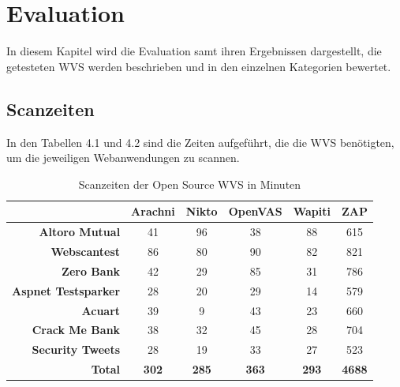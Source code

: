 \documentclass[12pt,oneside,a4paper,parskip,pointlessnumbers]{scrbook}
\begin{document}
\chapter{Evaluation}
In diesem Kapitel wird die Evaluation samt ihren Ergebnissen dargestellt, die getesteten WVS werden beschrieben und in den einzelnen Kategorien bewertet.
\section{Scanzeiten}
In den Tabellen 4.1 und 4.2 sind die Zeiten aufgeführt, die die WVS benötigten, um die jeweiligen Webanwendungen zu scannen.
\begin{table}[H]
\begin{tabular}{|r|c|c|c|c|c|}
\hline
                       & \textbf{Arachni} & \textbf{Nikto} & \textbf{OpenVAS} & \textbf{Wapiti} & \textbf{ZAP}  \\
\hline
\textbf{Altoro Mutual}      & 41               & 96             & 38               & 88              & 615                        \\
\hline
\textbf{Webscantest}        & 86               & 80             & 90               & 82              & 821                        \\
\hline
\textbf{Zero Bank}          & 42               & 29             & 85               & 31              & 786                        \\
\hline
\textbf{Aspnet Testsparker} & 28               & 20             & 29               & 14              & 579                        \\
\hline
\textbf{Acuart}             & 39               & 9              & 43               & 23              & 660                        \\
\hline
\textbf{Crack Me Bank}      & 38               & 32             & 45               & 28              & 704                        \\
\hline
\textbf{Security Tweets}    & 28               & 19             & 33               & 27              & 523                        \\
\hline
\textbf{Total}              & \textbf{302}     & \textbf{285}   & \textbf{363}     & \textbf{293}    & \textbf{4688}              \\
\hline
\end{tabular}
\caption[Scanzeiten der Open Source WVS in Minuten]{Scanzeiten der Open Source WVS in Minuten}
\end{table}
\end{document}
